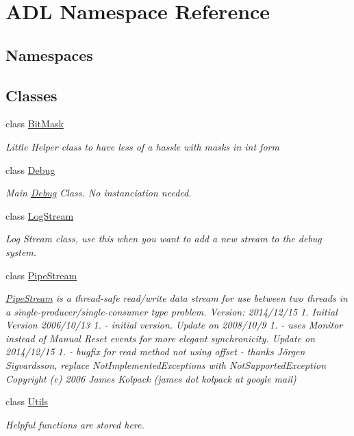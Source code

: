 \hypertarget{namespace_a_d_l}{}\section{A\+DL Namespace Reference}
\label{namespace_a_d_l}
\subsection*{Namespaces}
\begin{DoxyCompactItemize}
\end{DoxyCompactItemize}
\subsection*{Classes}
\begin{DoxyCompactItemize}
\item 
class \mbox{\hyperlink{class_a_d_l_1_1_bit_mask}{Bit\+Mask}}
\begin{DoxyCompactList}\small\item\em Little Helper class to have less of a hassle with masks in int form \end{DoxyCompactList}\item 
class \mbox{\hyperlink{class_a_d_l_1_1_debug}{Debug}}
\begin{DoxyCompactList}\small\item\em Main \mbox{\hyperlink{class_a_d_l_1_1_debug}{Debug}} Class. No instanciation needed. \end{DoxyCompactList}\item 
class \mbox{\hyperlink{class_a_d_l_1_1_log_stream}{Log\+Stream}}
\begin{DoxyCompactList}\small\item\em Log Stream class, use this when you want to add a new stream to the debug system. \end{DoxyCompactList}\item 
class \mbox{\hyperlink{class_a_d_l_1_1_pipe_stream}{Pipe\+Stream}}
\begin{DoxyCompactList}\small\item\em \mbox{\hyperlink{class_a_d_l_1_1_pipe_stream}{Pipe\+Stream}} is a thread-\/safe read/write data stream for use between two threads in a single-\/producer/single-\/consumer type problem. Version\+: 2014/12/15 1. Initial Version 2006/10/13 1. -\/ initial version. Update on 2008/10/9 1. -\/ uses Monitor instead of Manual Reset events for more elegant synchronicity. Update on 2014/12/15 1. -\/ bugfix for read method not using offset -\/ thanks Jörgen Sigvardsson, replace Not\+Implemented\+Exceptions with Not\+Supported\+Exception Copyright (c) 2006 James Kolpack (james dot kolpack at google mail) \end{DoxyCompactList}\item 
class \mbox{\hyperlink{class_a_d_l_1_1_utils}{Utils}}
\begin{DoxyCompactList}\small\item\em Helpful functions are stored here. \end{DoxyCompactList}\end{DoxyCompactItemize}
